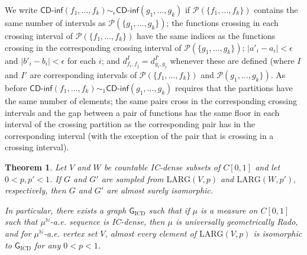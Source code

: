 \documentclass{daj}
\newtheorem{thm}{Theorem}
\newcommand{\LARG}{\mathrm{LARG}}
\newcommand{\N}{\mathbb N}
\newcommand{\cdinf}{\textsf{CD-inf}}
\begin{document}
We write $\cdinf(f_1,\ldots,f_k)\sim_\epsilon\cdinf(g_1,\ldots,g_k)$
if $\mathcal P(\{f_1,\ldots,f_k\})$ contains the same number of intervals as
$\mathcal P(\{g_1,\ldots,g_k\})$; the functions crossing in each crossing interval of
$\mathcal P(\{f_1,\ldots,f_k\})$ have the same indices as the functions crossing in the corresponding
crossing interval of $\mathcal P(\{g_1,\ldots,g_k\})$; $|a'_i-a_i|<\epsilon$
and $|b'_i-b_i|<\epsilon$ for each $i$;
and $d^{I}_{f_i,f_j}=d^{I'}_{g_i,g_j}$ whenever these are defined (where $I$ and $I'$ are corresponding
intervals of $\mathcal P(\{f_1,\ldots,f_k\})$ and $\mathcal P(g_1,\ldots,g_k\})$.
As before $\cdinf(f_1,\ldots,f_k)\sim_1\cdinf(g_1,\ldots,g_k)$ requires that the partitions
have the same number of elements; the same pairs cross in the corresponding crossing intervals
and the gap between a pair of functions has the same floor in each interval of the crossing partition as the
corresponding pair has in the corresponding interval (with the exception of the pair that is crossing in
a crossing interval).

\begin{thm}\label{thm:BMRado}
Let $V$ and $W$ be countable IC-dense subsets of $C[0,1]$ and let $0<p,p'<1$. If $G$ and
$G'$ are sampled from $\LARG(V,p)$ and $\LARG(W,p'),$ respectively, then
$G$ and $G'$ are almost surely isomorphic.

In particular, there exists a graph $\mathsf G_\text{ICD}$ such that if $\mu$ is a measure
on $C[0,1]$ such that $\mu^\N$-a.e. sequence is IC-dense, then $\mu$ is universally geometrically
Rado, and for $\mu^\N$-a.e. vertex set $V$, almost every element of $\LARG(V,p)$ is
isomorphic to $\mathsf G_\text{ICD}$ for any $0<p<1$.
\end{thm}
\end{document}
